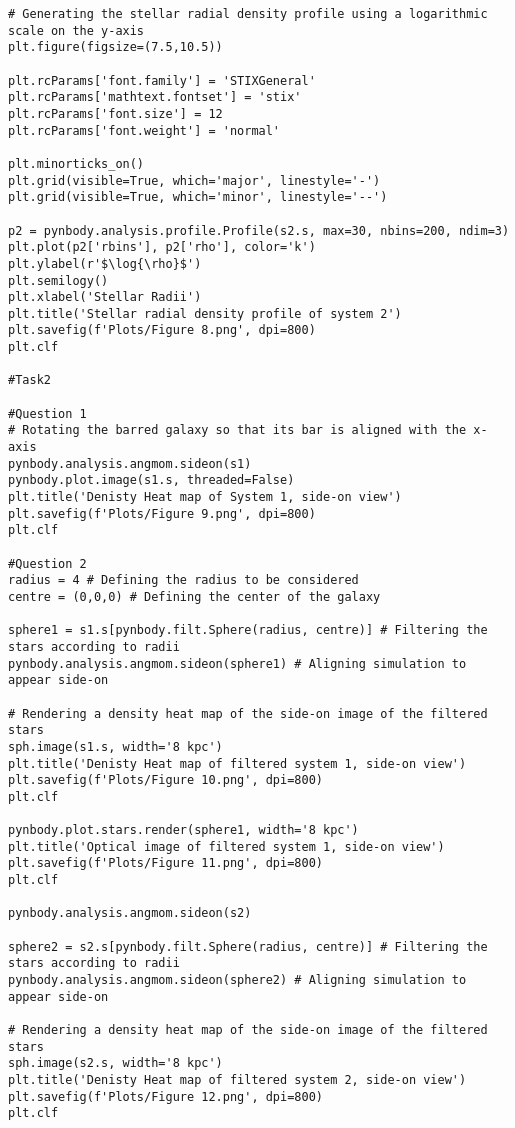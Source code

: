\documentclass[12pt, a4paper]{article}
\begin{document}
\begin{lstlisting}[language=iPython]
# Generating the stellar radial density profile using a logarithmic scale on the y-axis
plt.figure(figsize=(7.5,10.5))
  
plt.rcParams['font.family'] = 'STIXGeneral'
plt.rcParams['mathtext.fontset'] = 'stix'
plt.rcParams['font.size'] = 12
plt.rcParams['font.weight'] = 'normal'
  
plt.minorticks_on()
plt.grid(visible=True, which='major', linestyle='-')
plt.grid(visible=True, which='minor', linestyle='--')
  
p2 = pynbody.analysis.profile.Profile(s2.s, max=30, nbins=200, ndim=3)
plt.plot(p2['rbins'], p2['rho'], color='k')
plt.ylabel(r'$\log{\rho}$')
plt.semilogy()
plt.xlabel('Stellar Radii')
plt.title('Stellar radial density profile of system 2')
plt.savefig(f'Plots/Figure 8.png', dpi=800)
plt.clf
  
#Task2
  
#Question 1
# Rotating the barred galaxy so that its bar is aligned with the x-axis
pynbody.analysis.angmom.sideon(s1)
pynbody.plot.image(s1.s, threaded=False)
plt.title('Denisty Heat map of System 1, side-on view')
plt.savefig(f'Plots/Figure 9.png', dpi=800)
plt.clf
  
#Question 2
radius = 4 # Defining the radius to be considered 
centre = (0,0,0) # Defining the center of the galaxy
  
sphere1 = s1.s[pynbody.filt.Sphere(radius, centre)] # Filtering the stars according to radii
pynbody.analysis.angmom.sideon(sphere1) # Aligning simulation to appear side-on
  
# Rendering a density heat map of the side-on image of the filtered stars
sph.image(s1.s, width='8 kpc') 
plt.title('Denisty Heat map of filtered system 1, side-on view')
plt.savefig(f'Plots/Figure 10.png', dpi=800)
plt.clf
  
pynbody.plot.stars.render(sphere1, width='8 kpc') 
plt.title('Optical image of filtered system 1, side-on view')
plt.savefig(f'Plots/Figure 11.png', dpi=800)
plt.clf
  
pynbody.analysis.angmom.sideon(s2)
  
sphere2 = s2.s[pynbody.filt.Sphere(radius, centre)] # Filtering the stars according to radii
pynbody.analysis.angmom.sideon(sphere2) # Aligning simulation to appear side-on
  
# Rendering a density heat map of the side-on image of the filtered stars
sph.image(s2.s, width='8 kpc')
plt.title('Denisty Heat map of filtered system 2, side-on view')
plt.savefig(f'Plots/Figure 12.png', dpi=800)
plt.clf
  

\end{lstlisting}
\end{document}
